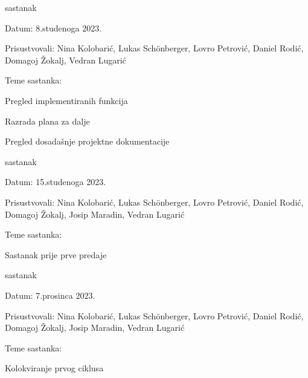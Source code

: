 \begin{packed_enum}
			\item  sastanak
			\item[] \begin{packed_item}
				\item Datum: 8.studenoga 2023.
				\item Prisustvovali: Nina Kolobarić, Lukas Schönberger, Lovro Petrović, Daniel Rodić, Domagoj Žokalj, Vedran Lugarić
				\item Teme sastanka:
				\begin{packed_item}
					\item  Pregled implementiranih funkcija
					\item  Razrada plana za dalje
					\item  Pregled dosadašnje projektne dokumentacije
				\end{packed_item}
			\end{packed_item}
			
			\item  sastanak
			\item[] \begin{packed_item}
				\item Datum: 15.studenoga 2023.
				\item Prisustvovali: Nina Kolobarić, Lukas Schönberger, Lovro Petrović, Daniel Rodić, Domagoj Žokalj, Josip Maradin, Vedran Lugarić
				\item Teme sastanka:
				\begin{packed_item}
					\item  Sastanak prije prve predaje

				\end{packed_item}
			\end{packed_item}
			
			\item  sastanak
			\item[] \begin{packed_item}
				\item Datum: 7.prosinca 2023.
				\item Prisustvovali: Nina Kolobarić, Lukas Schönberger, Lovro Petrović, Daniel Rodić, Domagoj Žokalj, Josip Maradin, Vedran Lugarić
				\item Teme sastanka:
				\begin{packed_item}
					\item  Kolokviranje prvog  ciklusa
				\end{packed_item}
			\end{packed_item}
			

\end{packed_enum}
